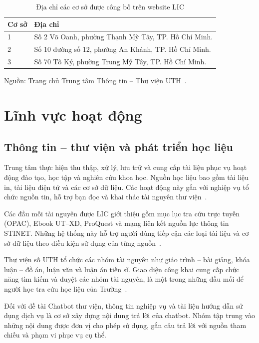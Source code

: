 \begin{table}[htbp]
\centering
\caption{Địa chỉ các cơ sở được công bố trên website LIC}
\label{tab:co-so}
\begin{tabularx}{\textwidth}{@{}P{1.5cm}Y@{}}
\toprule
\textbf{Cơ sở} & \textbf{Địa chỉ}\\
 & Số 2 Võ Oanh, phường Thạnh Mỹ Tây, TP. Hồ Chí Minh.\\
2 & Số 10 đường số 12, phường An Khánh, TP. Hồ Chí Minh.\\
3 & Số 70 Tô Ký, phường Trung Mỹ Tây, TP. Hồ Chí Minh.\\
\bottomrule
\end{tabularx}
\par\medskip
{\raggedright Nguồn: Trang chủ Trung tâm Thông tin -- Thư viện UTH~\cite{lic-trang-chu}.\par}
\end{table}

\section{Lĩnh vực hoạt động}

\subsection{Thông tin -- thư viện và phát triển học liệu}
Trung tâm thực hiện thu thập, xử lý, lưu trữ và cung cấp tài liệu phục vụ hoạt động đào tạo, học tập và nghiên cứu khoa học. Nguồn học liệu bao gồm tài liệu in, tài liệu điện tử và các cơ sở dữ liệu. Các hoạt động này gắn với nghiệp vụ tổ chức nguồn tin, hỗ trợ bạn đọc và khai thác tài nguyên thư viện~\cite{hkdn-de-tai}.

Các đầu mối tài nguyên được LIC giới thiệu gồm mục lục tra cứu trực tuyến (OPAC), Ebook UT--XD, ProQuest và mạng liên kết nguồn lực thông tin STINET. Những hệ thống này hỗ trợ người dùng tiếp cận các loại tài liệu và cơ sở dữ liệu theo điều kiện sử dụng của từng nguồn~\cite{lic-tai-nguyen}.

Thư viện số UTH tổ chức các nhóm tài nguyên như giáo trình -- bài giảng, khóa luận -- đồ án, luận văn và luận án tiến sĩ. Giao diện công khai cung cấp chức năng tìm kiếm và duyệt các nhóm tài nguyên, là một trong những đầu mối để người học tra cứu học liệu của Trường~\cite{uth-thu-vien-so}.

Đối với đề tài Chatbot thư viện, thông tin nghiệp vụ và tài liệu hướng dẫn sử dụng dịch vụ là cơ sở xây dựng nội dung trả lời của chatbot. Nhóm tập trung vào những nội dung được đơn vị cho phép sử dụng, gắn câu trả lời với nguồn tham chiếu và phạm vi phục vụ cụ thể.

